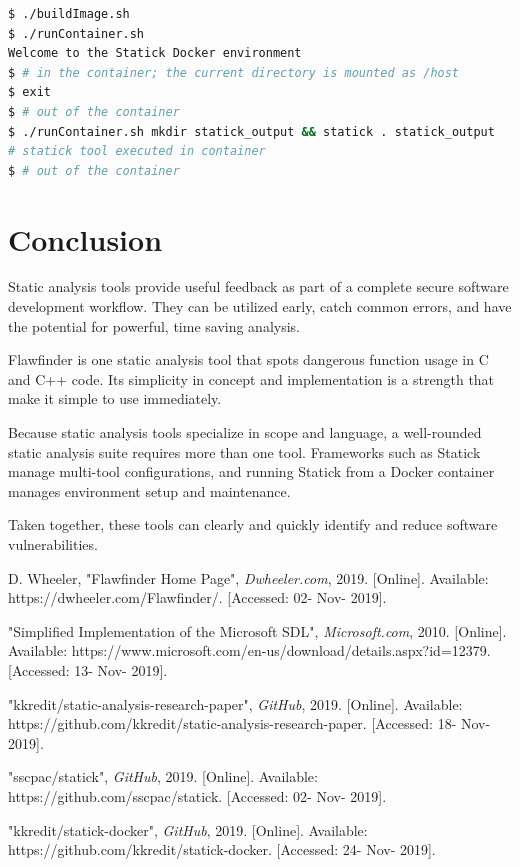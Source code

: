 \documentclass[journal]{IEEEtran}
\begin{document}
\begin{lstlisting}[language=bash, caption=Using the Statick Docker Container, label=lst:statick_container]
$ ./buildImage.sh
$ ./runContainer.sh
Welcome to the Statick Docker environment
$ # in the container; the current directory is mounted as /host
$ exit
$ # out of the container
$ ./runContainer.sh mkdir statick_output && statick . statick_output
# statick tool executed in container
$ # out of the container
\end{lstlisting}

\section{Conclusion}

Static analysis tools provide useful feedback as part of a complete secure software development
workflow. They can be utilized early, catch common errors, and have the potential for powerful, time
saving analysis.

Flawfinder is one static analysis tool that spots dangerous function usage in C and C++ code. Its
simplicity in concept and implementation is a strength that make it simple to use immediately.

Because static analysis tools specialize in scope and language, a well-rounded static analysis suite
requires more than one tool. Frameworks such as Statick manage multi-tool configurations, and
running Statick from a Docker container manages environment setup and maintenance.

Taken together, these tools can clearly and quickly identify and reduce software vulnerabilities.


\begin{thebibliography}{00}

 D. Wheeler, "Flawfinder Home Page", \textit{Dwheeler.com}, 2019. [Online].
Available: https://dwheeler.com/Flawfinder/. [Accessed: 02- Nov- 2019].

 "Simplified Implementation of the Microsoft SDL", \textit{Microsoft.com}, 2010.
[Online]. Available: https://www.microsoft.com/en-us/download/details.aspx?id=12379. [Accessed: 13-
Nov- 2019].

 "kkredit/static-analysis-research-paper", \textit{GitHub}, 2019. [Online].
Available: https://github.com/kkredit/static-analysis-research-paper. [Accessed: 18- Nov- 2019].

 "sscpac/statick", \textit{GitHub}, 2019. [Online]. Available:
https://github.com/sscpac/statick. [Accessed: 02- Nov- 2019].

 "kkredit/statick-docker", \textit{GitHub}, 2019. [Online]. Available:
https://github.com/kkredit/statick-docker. [Accessed: 24- Nov- 2019].

\end{thebibliography}
\end{document}
